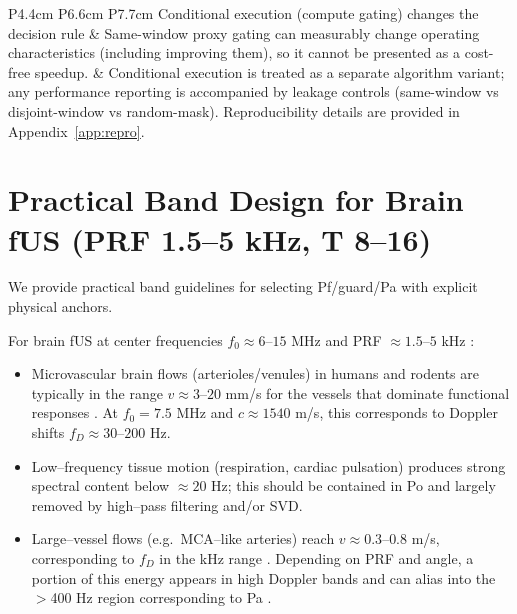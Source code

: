 \documentclass[11pt]{article}
\newif\ifPAPERONLY
\newcommand{\SuppOrApp}[1]{\ifPAPERONLY Supplementary Material\else Appendix~\ref{#1}\fi}
\begin{document}
\begin{table}[t]
{\begin{tabular}{P{4.4cm} P{6.6cm} P{7.7cm}}
Conditional execution (compute gating) changes the decision rule & Same-window proxy gating can measurably change operating characteristics (including improving them), so it cannot be presented as a cost-free speedup. & Conditional execution is treated as a separate algorithm variant; any performance reporting is accompanied by leakage controls (same-window vs disjoint-window vs random-mask). Reproducibility details are provided in \SuppOrApp{app:repro}. \\
\hline
\end{tabular}
}
\caption{Practical safeguards and audit checks. Each check is deterministic and label-free; it either records provenance/QC metrics or forces conservative penalty-layer behavior (e.g.\ $\phi_i\in\mathcal{R}_0$, $w\equiv 1$) with an explicit reason label.}
\label{tab:failure_modes_sentinels}
\end{table}

\section{Practical Band Design for Brain fUS (PRF 1.5--5 kHz, T 8--16)}
\label{sec:band-geometry}

We provide practical band guidelines for selecting Pf/guard/Pa with explicit physical anchors.

For brain fUS at center frequencies $f_0 \approx 6$--$15$ MHz and PRF $\approx 1.5$--$5$ kHz \cite{Mace2013,Rabut2020,Imbault2017,Urban2022,Deffieux2021}:

\begin{itemize}[nosep]
  \item Microvascular brain flows (arterioles/venules) in humans and rodents are typically in the range $v \approx 3$--$20$ mm/s for the vessels that dominate functional responses \cite{Imbault2017,Urban2022}. At $f_0=7.5$ MHz and $c\approx 1540$ m/s, this corresponds to Doppler shifts $f_D\approx 30$--$200$ Hz.
  \item Low--frequency tissue motion (respiration, cardiac pulsation) produces strong spectral content below $\approx 20$ Hz; this should be contained in Po and largely removed by high--pass filtering and/or SVD.
  \item Large--vessel flows (e.g.\ MCA--like arteries) reach $v\approx 0.3$--$0.8$ m/s, corresponding to $f_D$ in the kHz range \cite{TCDVelocities,TCDOptimalFlow}. Depending on PRF and angle, a portion of this energy appears in high Doppler bands and can alias into the $>$400 Hz region corresponding to Pa \cite{ICDFUS2021,MobileFUS2025}.
\end{itemize}
\end{document}
